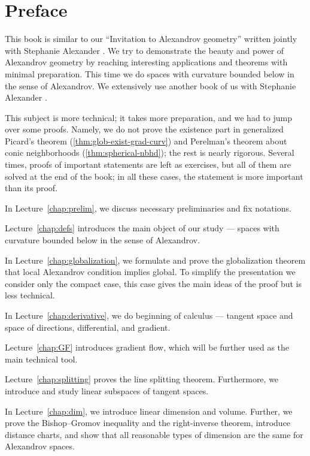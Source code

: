 \chapter*{Preface}

This book is similar to our ``Invitation to Alexandrov geometry'' written jointly with Stephanie Alexander \cite{alexander-kapovitch-petrunin-2019}.
We try to demonstrate the beauty and power of Alexandrov geometry by reaching interesting applications and theorems with minimal preparation.
This time we do spaces with curvature bounded below in the sense of Alexandrov.
We extensively use another book of us with Stephanie Alexander \cite{alexander-kapovitch-petrunin2024}.

This subject is more technical; it takes more preparation, and we had to jump over some proofs.
Namely, we do not prove the existence part in generalized Picard's theorem (\ref{thm:glob-exist-grad-curv})
and Perelman's theorem about conic neighborhoods (\ref{thm:spherical-nbhd});
the rest is nearly rigorous.
Several times, proofs of important statements are left as exercises,
but all of them are solved at the end of the book;
in all these cases, the statement is more important than its proof.

\medskip

In Lecture~\ref{chap:prelim}, we discuss necessary preliminaries and fix notations.

Lecture~\ref{chap:defs} introduces the main object of our study --- spaces with curvature bounded below in the sense of Alexandrov.

In Lecture~\ref{chap:globalization}, we formulate and prove the globalization theorem that local Alexandrov condition implies global.
To simplify the presentation we consider only the compact case, this case gives the main ideas of the proof but is less technical.

In Lecture~\ref{chap:derivative}, we do beginning of calculus --- tangent space and space of directions, differential, and gradient.

Lecture~\ref{chap:GF} introduces gradient flow, which will be further used as the main technical tool.

Lecture~\ref{chap:splitting} proves the line splitting theorem.
Furthermore, we introduce and study  linear subspaces of tangent spaces.

In Lecture~\ref{chap:dim}, we introduce linear dimension and volume.
Further, we prove the Bishop--Gromov inequality and the right-inverse theorem,
introduce  distance charts, and show that all reasonable types of dimension are the 
same for Alexandrov spaces.

